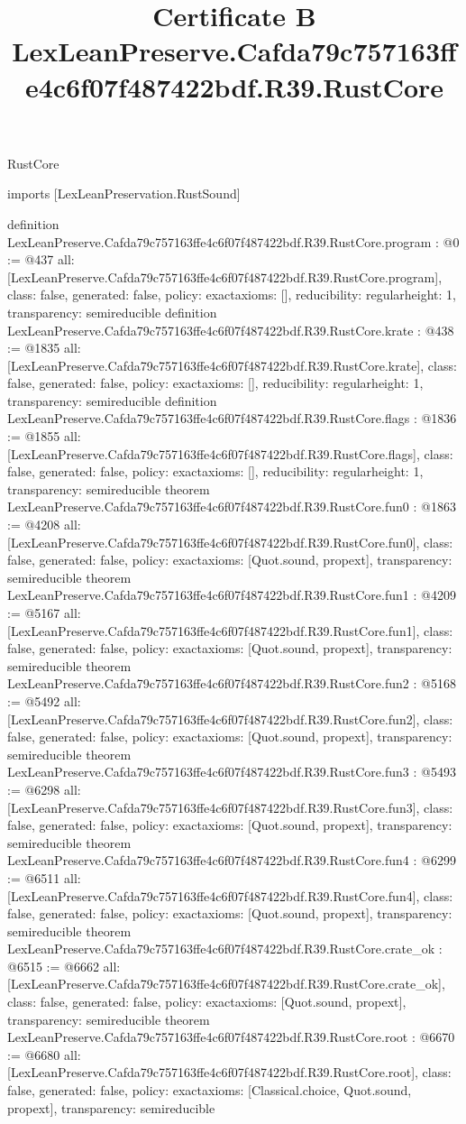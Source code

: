\begin{lexlean}{RustCore}
\title{Certificate B LexLeanPreserve.Cafda79c757163ffe4c6f07f487422bdf.R39.RustCore}
\begin{coremodule}
imports [LexLeanPreservation.RustSound]

definition LexLeanPreserve.Cafda79c757163ffe4c6f07f487422bdf.R39.RustCore.program : @0 := @437 {
  all: [LexLeanPreserve.Cafda79c757163ffe4c6f07f487422bdf.R39.RustCore.program],
  class: false,
  generated: false,
  policy: exact{axioms: []},
  reducibility: regular{height: 1},
  transparency: semireducible
}
definition LexLeanPreserve.Cafda79c757163ffe4c6f07f487422bdf.R39.RustCore.krate : @438 := @1835 {
  all: [LexLeanPreserve.Cafda79c757163ffe4c6f07f487422bdf.R39.RustCore.krate],
  class: false,
  generated: false,
  policy: exact{axioms: []},
  reducibility: regular{height: 1},
  transparency: semireducible
}
definition LexLeanPreserve.Cafda79c757163ffe4c6f07f487422bdf.R39.RustCore.flags : @1836 := @1855 {
  all: [LexLeanPreserve.Cafda79c757163ffe4c6f07f487422bdf.R39.RustCore.flags],
  class: false,
  generated: false,
  policy: exact{axioms: []},
  reducibility: regular{height: 1},
  transparency: semireducible
}
theorem LexLeanPreserve.Cafda79c757163ffe4c6f07f487422bdf.R39.RustCore.fun0 : @1863 := @4208 {
  all: [LexLeanPreserve.Cafda79c757163ffe4c6f07f487422bdf.R39.RustCore.fun0],
  class: false,
  generated: false,
  policy: exact{axioms: [Quot.sound, propext]},
  transparency: semireducible
}
theorem LexLeanPreserve.Cafda79c757163ffe4c6f07f487422bdf.R39.RustCore.fun1 : @4209 := @5167 {
  all: [LexLeanPreserve.Cafda79c757163ffe4c6f07f487422bdf.R39.RustCore.fun1],
  class: false,
  generated: false,
  policy: exact{axioms: [Quot.sound, propext]},
  transparency: semireducible
}
theorem LexLeanPreserve.Cafda79c757163ffe4c6f07f487422bdf.R39.RustCore.fun2 : @5168 := @5492 {
  all: [LexLeanPreserve.Cafda79c757163ffe4c6f07f487422bdf.R39.RustCore.fun2],
  class: false,
  generated: false,
  policy: exact{axioms: [Quot.sound, propext]},
  transparency: semireducible
}
theorem LexLeanPreserve.Cafda79c757163ffe4c6f07f487422bdf.R39.RustCore.fun3 : @5493 := @6298 {
  all: [LexLeanPreserve.Cafda79c757163ffe4c6f07f487422bdf.R39.RustCore.fun3],
  class: false,
  generated: false,
  policy: exact{axioms: [Quot.sound, propext]},
  transparency: semireducible
}
theorem LexLeanPreserve.Cafda79c757163ffe4c6f07f487422bdf.R39.RustCore.fun4 : @6299 := @6511 {
  all: [LexLeanPreserve.Cafda79c757163ffe4c6f07f487422bdf.R39.RustCore.fun4],
  class: false,
  generated: false,
  policy: exact{axioms: [Quot.sound, propext]},
  transparency: semireducible
}
theorem LexLeanPreserve.Cafda79c757163ffe4c6f07f487422bdf.R39.RustCore.crate_ok : @6515 := @6662 {
  all: [LexLeanPreserve.Cafda79c757163ffe4c6f07f487422bdf.R39.RustCore.crate_ok],
  class: false,
  generated: false,
  policy: exact{axioms: [Quot.sound, propext]},
  transparency: semireducible
}
theorem LexLeanPreserve.Cafda79c757163ffe4c6f07f487422bdf.R39.RustCore.root : @6670 := @6680 {
  all: [LexLeanPreserve.Cafda79c757163ffe4c6f07f487422bdf.R39.RustCore.root],
  class: false,
  generated: false,
  policy: exact{axioms: [Classical.choice, Quot.sound, propext]},
  transparency: semireducible
}


\end{coremodule}
\end{lexlean}
